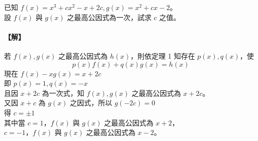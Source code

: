 \begin{example}\label{ex:7-1-6}
已知 $f(x) = x^3+cx^2-x+2c, g(x) = x^2+cx-2$。\\
設 $f(x)$ 與 $g(x)$ 之最高公因式為一次，試求 $c$ 之值。

\paragraph{【解】}
若 $f(x), g(x)$ 之最高公因式為 $h(x)$，則依定理 1 知存在 $p(x), q(x)$，使
\begin{equation*}
  p(x)f(x)+q(x)g(x) = h(x)
\end{equation*}
現在 $f(x)-xg(x) = x+2c$\\
即 $p(x) = 1, q(x) = -x$\\
且因 $x+2c$ 為一次式，知 $f(x), g(x)$ 之最高公因式為 $x+2c$。\\
又因 $x+c$ 為 $g(x)$ 之因式，所以 $g(-2c) = 0$\\
得 $c = \pm 1$\\
其中當 $c=1$，$f(x)$ 與 $g(x)$ 之最高公因式為 $x+2$，\\
$c=-1$，$f(x)$ 與 $g(x)$ 之最高公因式為 $x-2$。
\end{example}

